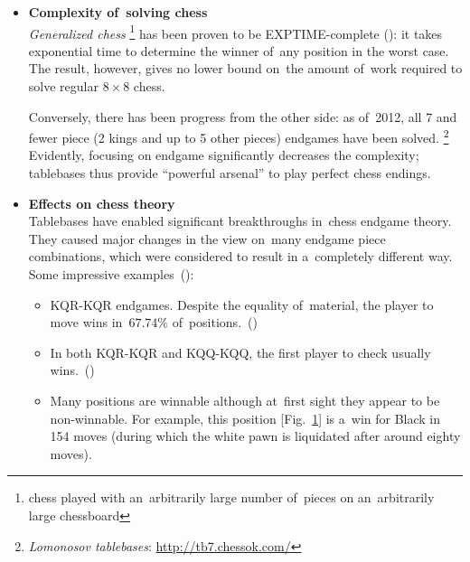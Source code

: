 \begin{itemize}
  \item \textbf{Complexity of~solving chess}
    \\
    \emph{Generalized chess}%
    \footnote{chess played with an~arbitrarily large number of~pieces on an~arbitrarily large chessboard}
    has been proven to be EXPTIME-complete (\cite{Fraenkel1981computing}):
    it takes exponential time to determine the winner of~any position in the worst case.
    The result, however, gives no lower bound on~the amount of~work required to solve regular $8\times 8$ chess.

    Conversely, there has been progress from the other side:
    as of~2012, all 7 and fewer piece (2 kings and up to 5 other pieces) endgames have been solved.%
    \footnote{\emph{Lomonosov tablebases}: \href{http://tb7.chessok.com/}{http://tb7.chessok.com/}}
    Evidently, focusing on endgame significantly decreases the complexity; tablebases thus provide ``powerful arsenal'' to play perfect chess endings.

  \item \textbf{Effects on chess theory}
    \\
    Tablebases have enabled significant breakthroughs in~chess endgame theory.
    They caused major changes in the view on~many endgame piece combinations, which were considered to result in a~completely different way.
    Some impressive examples~(\cite{Wikipedia2016endgame}):%
    \begin{itemize}
      \item KQR-KQR endgames.
        Despite the equality of~material, the player to move wins in~$67.74\%$ of~positions.~(\cite{Haworth2001discarding})

      \item In both KQR-KQR and KQQ-KQQ, the first player to check usually wins.~(\cite[p.~379, p.~384]{Nunn2002secrets})

      \item Many positions are winnable although at~first sight they appear to be non-winnable.
        For example, this position [Fig.~\ref{fig:80-moves-to-liquidate-the-pawn}] is a~win for Black in 154 moves (during which the white pawn is liquidated after around eighty moves).
        \begin{figure}[H]
          \centering
          \newgame
          \showboard
          \label{fig:80-moves-to-liquidate-the-pawn}
        \end{figure}


\end{itemize}
\end{itemize}
